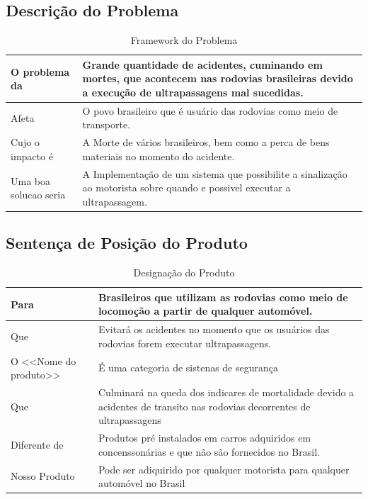 \subsection{Descrição do Problema}
\begin{table}[ht]
\caption{Framework do Problema}
\centering
\begin{tabular}{| l |  p{7cm} |}
\hline
O problema da & Grande quantidade de acidentes, cuminando em mortes, que acontecem nas rodovias brasileiras devido a execução de ultrapassagens mal sucedidas.  \\
\hline
Afeta & O povo brasileiro que é usuário das rodovias como meio de transporte. \\
\hline
Cujo o impacto é & A Morte de vários brasileiros, bem como a perca de bens materiais no momento do acidente.\\
\hline
Uma boa solucao seria & A Implementação de um sistema que possibilite a sinalização ao motorista sobre quando e possivel executar a ultrapassagem. \\
\hline
\end{tabular}
\end{table}


\subsection{Sentença de Posição do Produto}

\begin{table}[ht]
\caption{Designação do Produto}
\centering
\begin{tabular}{| l |  p{7cm} |}
\hline
Para & Brasileiros que utilizam as rodovias como meio de locomoção a partir de qualquer automóvel. \\
\hline
Que & Evitará os acidentes no momento que os usuários das rodovias forem executar ultrapassagens. \\
\hline
O <<Nome do produto>> & É uma categoria de sistenas de segurança\\
\hline
Que & Culminará na queda dos indicares de mortalidade devido a acidentes de transito nas rodovias decorrentes de ultrapassagens \\
\hline
Diferente de & Produtos pré instalados em carros adquiridos em concenssonárias e que não são fornecidos no Brasil.  \\
\hline
Nosso Produto & Pode ser adiquirido por qualquer motorista para qualquer automóvel no Brasil\\
\hline
\end{tabular}
\end{table}


